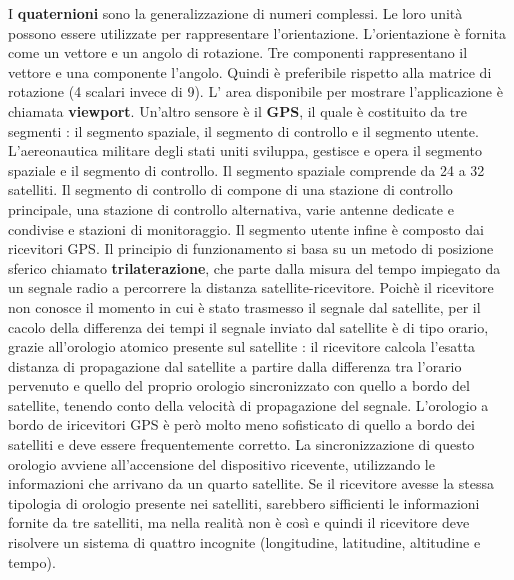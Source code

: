 \documentclass[12pt]{report}
\begin{document}
I \textbf{quaternioni} sono la generalizzazione di numeri complessi. Le loro unità possono essere utilizzate per rappresentare l'orientazione. L'orientazione è fornita come un vettore e un angolo di rotazione. Tre componenti rappresentano il vettore e una componente l'angolo. Quindi è preferibile rispetto alla matrice di rotazione (4 scalari invece di 9). L' area disponibile per mostrare l'applicazione è chiamata \textbf{viewport}. Un'altro sensore è il \textbf{GPS}, il quale è costituito da tre segmenti : il segmento spaziale, il segmento di controllo e il segmento utente. L'aereonautica militare degli stati uniti sviluppa, gestisce e opera il segmento spaziale e il segmento di controllo. Il segmento spaziale comprende da 24 a 32 satelliti. Il segmento di controllo di compone di una stazione di controllo principale, una stazione di controllo alternativa, varie antenne dedicate e condivise e stazioni di monitoraggio. Il segmento utente infine è composto dai ricevitori GPS. Il principio di funzionamento si basa su un metodo di posizione sferico chiamato \textbf{trilaterazione}, che parte dalla misura del tempo impiegato da un segnale radio a percorrere la distanza satellite-ricevitore. Poichè il ricevitore non conosce il momento in cui è stato trasmesso il segnale dal satellite, per il cacolo della differenza dei tempi il segnale inviato dal satellite è di tipo orario, grazie all'orologio atomico presente sul satellite : il ricevitore calcola l'esatta distanza di propagazione dal satellite a partire dalla differenza tra l'orario pervenuto e quello del proprio orologio sincronizzato con quello a bordo del satellite, tenendo conto della velocità di propagazione del segnale. L'orologio a bordo de iricevitori GPS è però molto meno sofisticato di quello a bordo dei satelliti e deve essere frequentemente corretto. La sincronizzazione di questo orologio avviene all'accensione del dispositivo ricevente, utilizzando le informazioni che arrivano da un quarto satellite. Se il ricevitore avesse la stessa tipologia di orologio presente nei satelliti, sarebbero sifficienti le informazioni fornite da tre satelliti, ma nella realità non è così e quindi il ricevitore deve risolvere un sistema di quattro incognite (longitudine, latitudine, altitudine e tempo).
\end{document}
